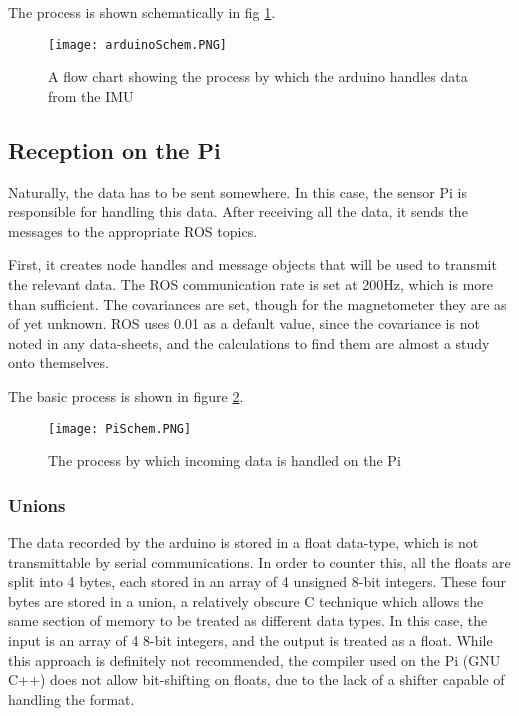 The process is shown schematically in fig \ref{fig::ardschem}.

\begin{figure}[H]
\centering
\texttt{[image: arduinoSchem.PNG]}
\caption{A flow chart showing the process by which the arduino handles data from the IMU}
\label{fig::ardschem}
\end{figure}

\subsection{Reception on the Pi}
Naturally, the data has to be sent somewhere.
In this case, the sensor Pi is responsible for handling this data.
After receiving all the data, it sends the messages to the appropriate ROS topics.

First, it creates node handles and message objects that will be used to transmit the relevant data.
The ROS communication rate is set at 200Hz, which is more than sufficient.
The covariances are set, though for the magnetometer they are as of yet unknown.
ROS uses 0.01 as a default value, since the covariance is not noted in any data-sheets, and the calculations to find them are almost a study onto themselves.

The basic process is shown in figure \ref{fig::piDataReception}.

\begin{figure}[H]
\centering
\texttt{[image: PiSchem.PNG]}
\caption{The process by which incoming data is handled on the Pi}
\label{fig::piDataReception}
\end{figure}


\subsubsection{Unions} \label{sec::union}
The data recorded by the arduino is stored in a float data-type, which is not transmittable by serial communications.
In order to counter this, all the floats are split into 4 bytes, each stored in an array of 4 unsigned 8-bit integers.
These four bytes are stored in a union, a relatively obscure C technique which allows the same section of memory to be treated as different data types.
In this case, the input is an array of 4 8-bit integers, and the output is treated as a float.
While this approach is definitely not recommended, the compiler used on the Pi (GNU C++) does not allow bit-shifting on floats, due to the lack of a shifter capable of handling the format.

